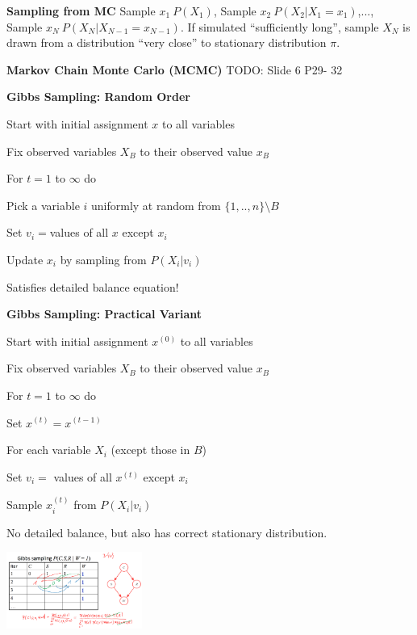 \documentclass[a4paper, 11pt, landscape]{article}
\begin{document}
\begin{multicols*}{3}
\textbf{Sampling from MC}
Sample $x_1~P(X_1)$, Sample $x_2~P(X_2 | X_1=x_1)$,..., Sample $x_N~P(X_N | X_{N-1}=x_{N-1})$.
If simulated “sufficiently long”, sample $X_N$ is drawn from a distribution “very close” to stationary distribution $\pi$.

\textbf{Markov Chain Monte Carlo (MCMC)}
TODO: Slide 6 P29- 32

\textbf{Gibbs Sampling: Random Order}
\begin{compactitem}
\item Start with initial assignment $x$ to all variables
\item Fix observed variables $X_B$ to their observed value $x_B$
\item For $t=1$ to $\infty$ do
\begin{compactenum}
\item Pick a variable $i$ uniformly at random from $\{1,..,n\} \setminus B$
\item Set $v_i = $values of all $x$ except $x_i$
\item Update $x_i$ by sampling from $P(X_i | v_i)$
\end{compactenum}
\end{compactitem}
Satisfies detailed balance equation!

\textbf{Gibbs Sampling: Practical Variant}
\begin{compactitem}
 \item Start with initial assignment $x^{(0)}$ to all variables
 \item Fix observed variables $X_B$ to their observed value $x_B$
 \item For $t=1$ to $\infty$ do 
\begin{compactenum}
\item Set $x^{(t)} = x^{(t-1)}$
\item For each variable $X_i$ (except those in $B$) 
\item Set $v_i =$ values of all $x^{(t)}$ except $x_i$
\item Sample $x_i^{(t)}$ from $P(X_i | v_i)$
\end{compactenum}
\end{compactitem}
No detailed balance, but also has correct stationary distribution.

\includegraphics[height=2.5cm]{img/pai3.png}


\end{multicols*}
\end{document}
